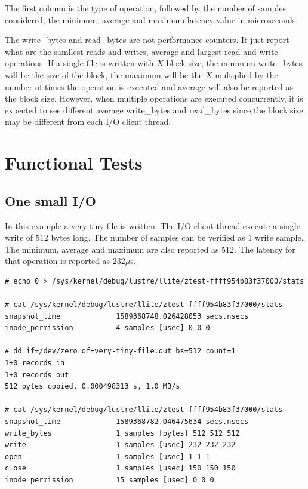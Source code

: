 \documentclass{article}
\begin{document}
The first column is the type of operation, followed by the number of samples considered, the minimum, average and maximum latency value in microseconds.

The write\_bytes and read\_bytes are not performance counters. It just report what are the samllest reads and writes, average and largest read and write operations. If a single file is written with $X$ block size, the minimum write\_bytes will be the size of the block, the maximum will be the $X$ multiplied by the number of times the operation is executed and average will also be reported as the block size. However, when multiple operations are executed concurrently, it is expected to see different average write\_bytes and read\_bytes since the block size may be different from each I/O client thread.

\section{Functional Tests}
\subsection{One small I/O}
In this example a very tiny file is written. The I/O client thread execute a single write of 512 bytes long. The number of samples can be verified as 1 write sample. The minimum, average and maximum are also reported as 512. The latency for that operation is reported as 232$\mu$s.

\begin{verbatim}
# echo 0 > /sys/kernel/debug/lustre/llite/ztest-ffff954b83f37000/stats

# cat /sys/kernel/debug/lustre/llite/ztest-ffff954b83f37000/stats
snapshot_time             1589368748.026428053 secs.nsecs
inode_permission          4 samples [usec] 0 0 0

# dd if=/dev/zero of=very-tiny-file.out bs=512 count=1
1+0 records in
1+0 records out
512 bytes copied, 0.000498313 s, 1.0 MB/s

# cat /sys/kernel/debug/lustre/llite/ztest-ffff954b83f37000/stats
snapshot_time             1589368782.046475634 secs.nsecs
write_bytes               1 samples [bytes] 512 512 512
write                     1 samples [usec] 232 232 232
open                      1 samples [usec] 1 1 1
close                     1 samples [usec] 150 150 150
inode_permission          15 samples [usec] 0 0 0

\end{verbatim}
\end{document}
